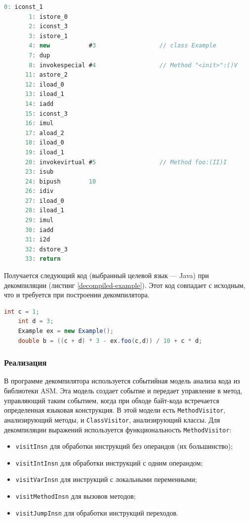 \begin{lstlisting}[label=jvm-example,caption = Пример кода выражения в JVM без переходов, frame = single, language = JAVA]
       0: iconst_1
       1: istore_0
       2: iconst_3
       3: istore_1
       4: new           #3                  // class Example
       7: dup
       8: invokespecial #4                  // Method "<init>":()V
      11: astore_2
      12: iload_0
      13: iload_1
      14: iadd
      15: iconst_3
      16: imul
      17: aload_2
      18: iload_0
      19: iload_1
      20: invokevirtual #5                  // Method foo:(II)I
      23: isub
      24: bipush        10
      26: idiv
      27: iload_0
      28: iload_1
      29: imul
      30: iadd
      31: i2d
      32: dstore_3
      33: return
\end{lstlisting}

Получается следующий код (выбранный целевой язык --- Java) при декомпиляции (листинг \ref{decompiled-example}). Этот код совпадает с исходным, что и требуется при построении декомпилятора.

\begin{lstlisting}[label=decompiled-example,caption = Пример кода выражения в JVM без переходов, frame = single, language = JAVA]
	int c = 1; 
	int d = 3; 
	Example ex = new Example();
	double b = ((c + d) * 3 - ex.foo(c,d)) / 10 + c * d; 
\end{lstlisting} 

\subsubsection*{Реализация}
В программе декомпилятора используется событийная модель анализа кода из библиотеки ASM. Эта модель создает событие и передает управление в метод, управляющий таким событием, когда при обходе байт-кода встречается определенная языковая конструкция. В этой модели есть \texttt{MethodVisitor}, анализирующий методы, и \texttt{ClassVisitor}, анализирующий классы. Для декомпиляции выражений используется функциональность \texttt{MethodVisitor}:
\begin{itemize}
\item \texttt{visitInsn} для обработки инструкций без операндов (их большинство);
\item \texttt{visitIntInsn} для обработки инструкций с одним операндом;
\item \texttt{visitVarInsn} для инструкций с локальными переменными;
\item \texttt{visitMethodInsn} для вызовов методов;
\item \texttt{visitJumpInsn} для обработки инструкций переходов.
\end{itemize}

